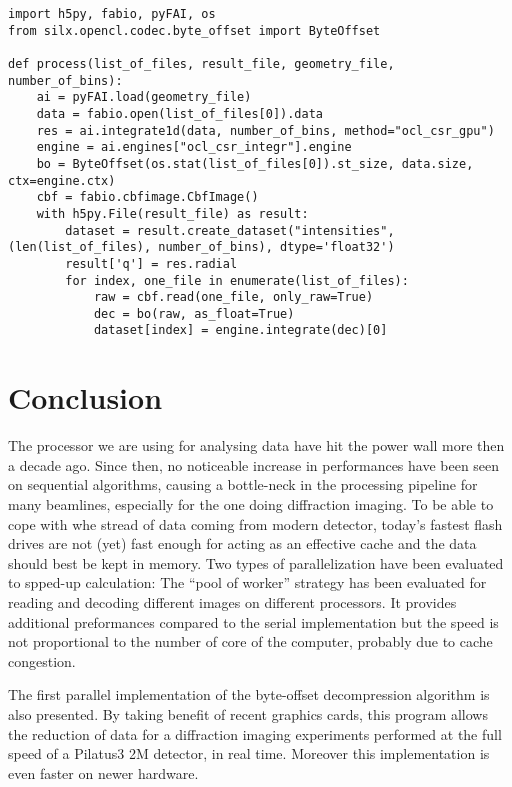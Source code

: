 \documentclass[preprint, pdf]{iucr}              %
\begin{document}
\begin{verbatim}
import h5py, fabio, pyFAI, os
from silx.opencl.codec.byte_offset import ByteOffset

def process(list_of_files, result_file, geometry_file, number_of_bins):
    ai = pyFAI.load(geometry_file)
    data = fabio.open(list_of_files[0]).data
    res = ai.integrate1d(data, number_of_bins, method="ocl_csr_gpu")
    engine = ai.engines["ocl_csr_integr"].engine
    bo = ByteOffset(os.stat(list_of_files[0]).st_size, data.size, ctx=engine.ctx)
    cbf = fabio.cbfimage.CbfImage()
    with h5py.File(result_file) as result:
        dataset = result.create_dataset("intensities", (len(list_of_files), number_of_bins), dtype='float32')
        result['q'] = res.radial
        for index, one_file in enumerate(list_of_files):
            raw = cbf.read(one_file, only_raw=True)
            dec = bo(raw, as_float=True)
            dataset[index] = engine.integrate(dec)[0]
\end{verbatim}


\section{Conclusion}

The processor we are using for analysing data have hit the power wall more then
a  decade ago.
Since then,  no noticeable increase in performances have been seen on
sequential algorithms, causing a bottle-neck in the processing
pipeline for many beamlines, especially for the one doing diffraction imaging.
To be able to cope with whe stread of data coming from modern detector, today's
fastest flash drives are not (yet) fast  enough for acting as an
effective cache and the data should best be kept in memory.
Two types of parallelization have been evaluated to spped-up calculation:  
The ``pool of worker'' strategy has been evaluated for reading and decoding
different images on different processors.
It provides additional preformances compared to the serial implementation but
the speed is not proportional to the number of core of the computer, probably due 
to cache congestion.

The first parallel implementation of the byte-offset decompression 
algorithm is also presented. 
By taking benefit of recent graphics cards, this program allows the reduction
of data for a diffraction imaging experiments performed at the full speed of
a Pilatus3 2M detector, in real time. 
Moreover this implementation is even faster on newer hardware. 
\end{document}
